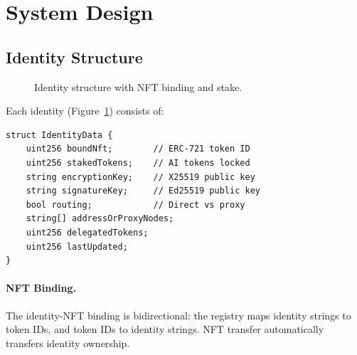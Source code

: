 \section{System Design}


\subsection{Identity Structure}

\begin{figure}[t]
\centering
{}
\caption{Identity structure with NFT binding and stake.}
\label{fig:identity}
\end{figure}

Each identity (Figure~\ref{fig:identity}) consists of:

\begin{lstlisting}[language=Solidity]
struct IdentityData {
    uint256 boundNft;        // ERC-721 token ID
    uint256 stakedTokens;    // AI tokens locked
    string encryptionKey;    // X25519 public key
    string signatureKey;     // Ed25519 public key
    bool routing;            // Direct vs proxy
    string[] addressOrProxyNodes;
    uint256 delegatedTokens;
    uint256 lastUpdated;
}
\end{lstlisting}

\paragraph{NFT Binding.} The identity-NFT binding is bidirectional: the registry maps identity strings to token IDs, and token IDs to identity strings. NFT transfer automatically transfers identity ownership.

